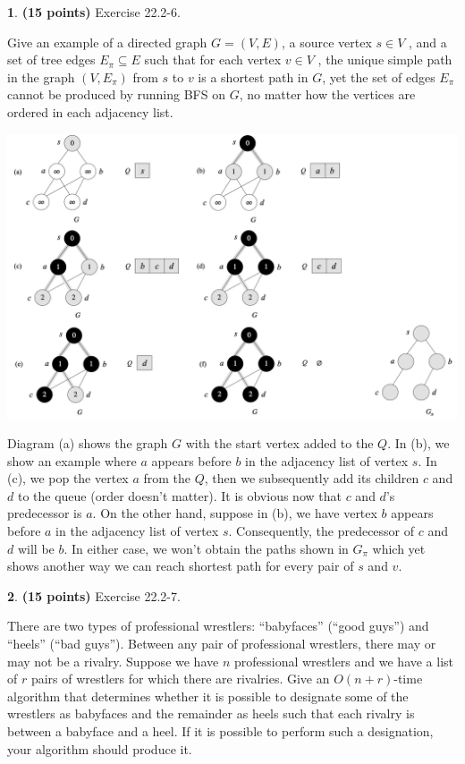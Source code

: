 \documentclass[11pt]{article}
\theoremstyle{definition}
\theoremstyle{theorem}
\newtheorem{prob}{}
\newcommand{\solution}{\medskip\noindent{\color{DarkBlue}\textbf{Solution:}}}
\begin{document}
\newpage
\begin{prob} \textbf{(15 points)} Exercise 22.2-6.
\end{prob}

Give an example of a directed graph $G = (V, E)$, a source vertex $s \in V$ , and a set of tree edges $E_{\pi} \subseteq E$ such that for each vertex $v \in V$ , the unique simple path in the graph $(V, E_{\pi})$ from $s$ to $v$ is a shortest path in $G$, yet the set of edges $E_{\pi}$ cannot be produced by running BFS on $G$, no matter how the vertices are ordered in each adjacency list.

\solution

\includegraphics[scale=0.62]{./hw10q2.png}

Diagram (a) shows the graph $G$ with the start vertex added to the $Q$. In (b), we show an example where $a$ appears before $b$ in the adjacency list of vertex $s$. In (c), we pop the vertex $a$ from the $Q$, then we subsequently add its children $c$ and $d$ to the queue (order doesn't matter). It is obvious now that $c$ and $d$'s predecessor is $a$. On the other hand, suppose in (b), we have vertex $b$ appears before $a$ in the adjacency list of vertex $s$. Consequently, the predecessor of $c$ and $d$ will be $b$. In either case, we won't obtain the paths shown in $G_{\pi}$ which yet shows another way we can reach shortest path for every pair of $s$ and $v$.


\newpage
\begin{prob} \textbf{(15 points)} Exercise 22.2-7.
\end{prob}

There are two types of professional wrestlers: “babyfaces” (“good guys”) and “heels” (“bad guys”). Between any pair of professional wrestlers, there may or may not be a rivalry. Suppose we have $n$ professional wrestlers and we have a list of $r$ pairs of wrestlers for which there are rivalries. Give an $O(n + r)$-time algorithm that determines whether it is possible to designate some of the wrestlers as babyfaces and the remainder as heels such that each rivalry is between a babyface and a heel. If it is possible to perform such a designation, your algorithm should produce it.
\end{document}
